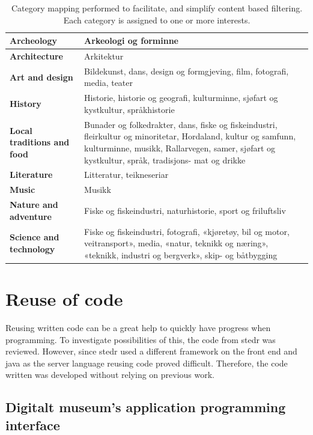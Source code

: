 \begin{table}[!h]
	\begin{center}
		\begin{tabular}{ | p{5cm} | p{12cm}|}
			\hline
			\textbf{Archeology} & Arkeologi og forminne \\ \hline
			\textbf{Architecture} & Arkitektur \\ \hline
			\textbf{Art and design} & Bildekunst, dans, design og formgjeving, film, fotografi, media, teater \\ \hline
			\textbf{History} & Historie, historie og geografi, kulturminne, sjøfart og kystkultur, språkhistorie \\ \hline
			\textbf{Local traditions and food} & Bunader og folkedrakter, dans, fiske og fiskeindustri, fleirkultur og minoritetar, Hordaland, kultur og samfunn, kulturminne, musikk, Rallarvegen, samer, sjøfart og kystkultur, språk, tradisjons- mat og drikke \\ \hline
			\textbf{Literature } & Litteratur, teikneseriar \\ \hline
			\textbf{Music} & Musikk \\ \hline
			\textbf{Nature and adventure} & Fiske og fiskeindustri, naturhistorie, sport og friluftsliv \\ \hline
			\textbf{Science and technology} & Fiske og fiskeindustri, fotografi, «kjøretøy, bil og motor, veitransport», media, «natur, teknikk og næring», «teknikk, industri og bergverk», skip- og båtbygging \\ \hline
		\end{tabular}
	\end{center}
	\caption{Category mapping performed to facilitate, and simplify content based filtering. Each category is assigned to one or more interests.}
	\label{Tab_categorymapping}
\end{table}

\section{Reuse of code}

Reusing written code can be a great help to quickly have progress when programming.  To investigate possibilities of this, the code from stedr was reviewed. However, since stedr used a different framework on the front end and java as the server language reusing code proved difficult. Therefore, the code written was developed without relying on previous work.

\subsection{Digitalt museum’s application programming interface}

